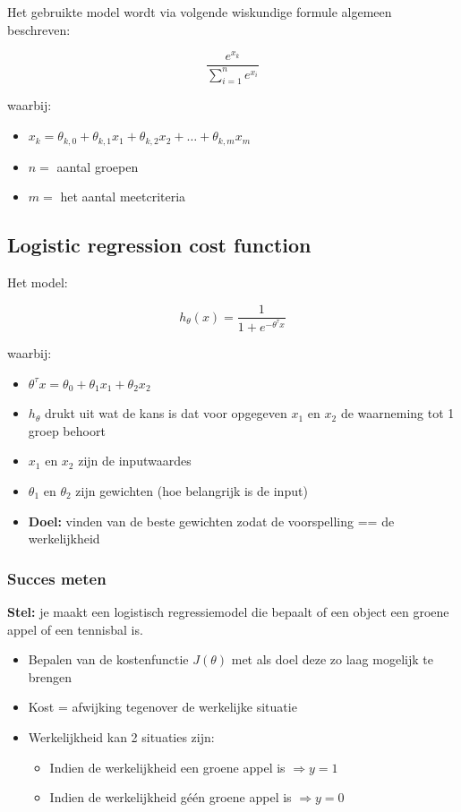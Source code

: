\documentclass{article}
\begin{document}
Het gebruikte model wordt via volgende wiskundige formule algemeen beschreven:

\begin{equation}
\frac{e^{x_k}}{\sum_{i=1}^n e^{x_i}}
\end{equation}

waarbij:

\begin{itemize}
    \item $x_k = \theta_{k,0} + \theta_{k,1}x_1 + \theta_{k,2}x_2 + \dots + \theta_{k,m}x_m$
    \item $n =$ aantal groepen
    \item $m =$ het aantal meetcriteria
\end{itemize}

\subsection{Logistic regression cost function}

Het model:

\begin{equation}
h_{\theta}(x) = \frac{1}{1 + e^{-\theta^{\tau}x}}
\end{equation}

waarbij:

\begin{itemize}
    \item $\theta^{\tau}x = \theta_0 + \theta_1x_1 + \theta_2x_2$
    \item $h_{\theta}$ drukt uit wat de kans is dat voor opgegeven $x_1$ en $x_2$ de waarneming tot 1 groep behoort
    \item $x_1$ en $x_2$ zijn de inputwaardes
    \item $\theta_1$ en $\theta_2$ zijn gewichten (hoe belangrijk is de input)
    \item \textbf{Doel: } vinden van de beste gewichten zodat de voorspelling == de werkelijkheid
\end{itemize}

\subsubsection{Succes meten}

\textbf{Stel:} je maakt een logistisch regressiemodel die bepaalt of een object een groene appel of een tennisbal is. 

\begin{itemize}
    \item Bepalen van de kostenfunctie $J(\theta)$ met als doel deze zo laag mogelijk te brengen
    \item Kost = afwijking tegenover de werkelijke situatie
    \item Werkelijkheid kan 2 situaties zijn:
    \begin{itemize}
        \item Indien de werkelijkheid een groene appel is $\Rightarrow y = 1$ 
        \item Indien de werkelijkheid géén groene appel is $\Rightarrow y = 0$ 
    \end{itemize}
\end{itemize}
\end{document}
